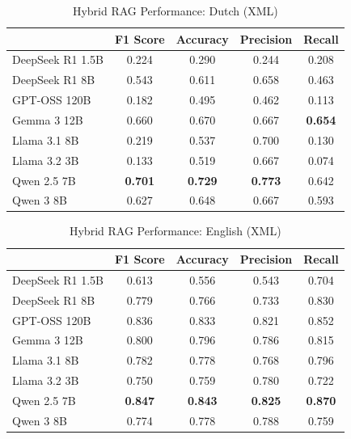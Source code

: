 
\begin{table}[!htbp]
\caption{Hybrid RAG Performance: Dutch (XML)}
\label{tab:hybrid_dutch_xml}
\begin{tabular}{lcccc}
\toprule
 & F1 Score & Accuracy & Precision & Recall \\
\midrule
DeepSeek R1 1.5B & 0.224 & 0.290 & 0.244 & 0.208 \\
DeepSeek R1 8B & 0.543 & 0.611 & 0.658 & 0.463 \\
GPT-OSS 120B & 0.182 & 0.495 & 0.462 & 0.113 \\
Gemma 3 12B & 0.660 & 0.670 & 0.667 & \textbf{0.654} \\
Llama 3.1 8B & 0.219 & 0.537 & 0.700 & 0.130 \\
Llama 3.2 3B & 0.133 & 0.519 & 0.667 & 0.074 \\
Qwen 2.5 7B & \textbf{0.701} & \textbf{0.729} & \textbf{0.773} & 0.642 \\
Qwen 3 8B & 0.627 & 0.648 & 0.667 & 0.593 \\
\bottomrule
\end{tabular}
\end{table}


\begin{table}[!htbp]
\caption{Hybrid RAG Performance: English (XML)}
\label{tab:hybrid_english_xml}
\begin{tabular}{lcccc}
\toprule
 & F1 Score & Accuracy & Precision & Recall \\
\midrule
DeepSeek R1 1.5B & 0.613 & 0.556 & 0.543 & 0.704 \\
DeepSeek R1 8B & 0.779 & 0.766 & 0.733 & 0.830 \\
GPT-OSS 120B & 0.836 & 0.833 & 0.821 & 0.852 \\
Gemma 3 12B & 0.800 & 0.796 & 0.786 & 0.815 \\
Llama 3.1 8B & 0.782 & 0.778 & 0.768 & 0.796 \\
Llama 3.2 3B & 0.750 & 0.759 & 0.780 & 0.722 \\
Qwen 2.5 7B & \textbf{0.847} & \textbf{0.843} & \textbf{0.825} & \textbf{0.870} \\
Qwen 3 8B & 0.774 & 0.778 & 0.788 & 0.759 \\
\bottomrule
\end{tabular}
\end{table}


